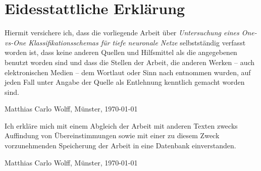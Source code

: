 \chapter*{Eidesstattliche Erklärung}


Hiermit versichere ich, dass die vorliegende Arbeit über \textit{\glqq Untersuchung eines One-vs-One Klassifikationsschemas für tiefe neuronale Netze\grqq} selbstständig verfasst worden ist, dass keine anderen Quellen und Hilfsmittel als die angegebenen benutzt worden sind und dass die Stellen der Arbeit, die anderen Werken – auch elektronischen Medien – dem Wortlaut oder Sinn nach entnommen wurden, auf jeden Fall unter Angabe der Quelle als Entlehnung kenntlich gemacht worden sind.

\vspace{1cm}

\parbox{20em}{\hrulefill}

Matthias Carlo Wolff, Münster, \today

\vspace{1cm}

Ich erkläre mich mit einem Abgleich der Arbeit mit anderen Texten zwecks Auffindung von Übereinstimmungen sowie mit einer zu diesem Zweck vorzunehmenden Speicherung der Arbeit in eine Datenbank einverstanden.

\vspace{1cm}

\parbox{20em}{\hrulefill}

Matthias Carlo Wolff, Münster, \today